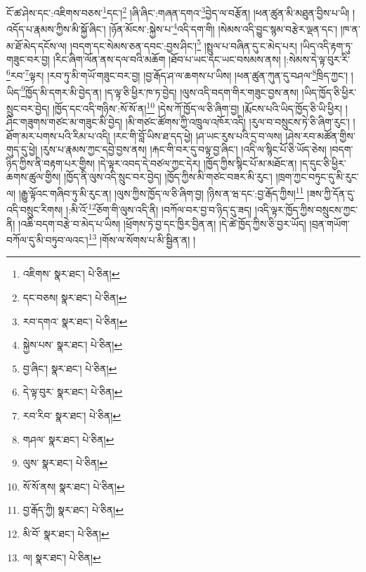 ངོ་ཚ་ཤེས་དང་:འཇིགས་བཅས་\footnote{འཇིགས་  སྣར་ཐང་།  པེ་ཅིན། }དང་།\footnote{དང་བཅས།  སྣར་ཐང་།  པེ་ཅིན། } །ཞི་ཞིང་:གཞན་དགའ་\footnote{རབ་དགའ་  སྣར་ཐང་།  པེ་ཅིན། }བྱེད་ལ་བརྩོན། །ཕན་ཚུན་མི་མཐུན་བྱིས་པ་ཡི། །འདོད་པ་རྣམས་ཀྱིས་མི་སྐྱོ་ཞིང་། །ཉོན་མོངས་:སྐྱེས་པ་\footnote{སྐྱེས་པས་  སྣར་ཐང་།  པེ་ཅིན། }འདི་དག་གི། །སེམས་འདི་བྱུང་སྙམ་བརྩེར་ལྡན་དང་། །ཁ་ན་མ་ཐོ་མེད་དངོས་ལ། །བདག་དང་སེམས་ཅན་དབང་:བྱས་ཤིང་།\footnote{བྱ་ཞིང་།  སྣར་ཐང་།  པེ་ཅིན། } །སྤྲུལ་པ་བཞིན་དུ་ང་མེད་པར། །ཡིད་འདི་རྟག་ཏུ་གཟུང་བར་བྱ། །རིང་ཞིག་ལོན་ནས་དལ་བའི་མཆོག །ཐོབ་པ་ཡང་དང་ཡང་བསམས་ནས། །:སེམས་དེ་ལྟ་བུར་རི་\footnote{དེ་ལྟ་བུར་  སྣར་ཐང་།  པེ་ཅིན། }རབ་\footnote{རབ་རིབ་  སྣར་ཐང་།  པེ་ཅིན། }ལྟར། །རབ་ཏུ་མི་གཡོ་གཟུང་བར་བྱ། །བྱ་རྒོད་ཤ་ལ་ཆགས་པ་ཡིས། །ཕན་ཚུན་ཀུན་དུ་བཤལ་\footnote{གཤལ་  སྣར་ཐང་།  པེ་ཅིན། }ཁྲིད་ཀྱང་། །ཡིད་\footnote{ལུས་  སྣར་ཐང་།  པེ་ཅིན། }ཁྱོད་མི་དགར་མི་བྱེད་ན། །ད་ལྟ་ཅི་ཕྱིར་ཁ་ཏ་བྱེད། །ལུས་འདི་བདག་གིར་གཟུང་བྱས་ནས། །ཡིད་ཁྱོད་ཅི་ཕྱིར་སྲུང་བར་བྱེད། །ཁྱོད་དང་འདི་གཉིས་:སོ་སོ་ན།\footnote{སོ་སོ་ནས།  སྣར་ཐང་།  པེ་ཅིན། } །དེས་ཀོ་ཁྱོད་ལ་ཅི་ཞིག་བྱ། །རྨོངས་པའི་ཡིད་ཁྱོད་ཅི་ཡི་ཕྱིར། །ཤིང་གཟུགས་གཙང་མ་གཟུང་མི་བྱེད། །མི་གཙང་ཚོགས་ཀྱི་འཁྲུལ་འཁོར་འདི། །རུལ་བ་བསྲུངས་ཏེ་ཅི་ཞིག་རུང་། །ཐོག་མར་པགས་པའི་རིམ་པ་འདི། །རང་གི་བློ་ཡིས་ཐ་དད་ཕྱེ། །ཤ་ཡང་རུས་པའི་དྲ་བ་ལས། །ཤེས་རབ་མཚོན་གྱིས་གུད་དུ་ཕྱེ། །རུས་པ་རྣམས་ཀྱང་དབྱེ་བྱས་ནས། །རྐང་གི་བར་དུ་བལྟ་བྱ་ཞིང་། །འདི་ལ་སྙིང་པོ་ཅི་ཡོད་ཅེས། །བདག་ཉིད་ཀྱིས་ནི་བརྟག་པར་གྱིས། །དེ་ལྟར་འབད་དེ་བཙལ་ཀྱང་དེར། །ཁྱོད་ཀྱིས་སྙིང་པོ་མ་མཐོང་ན། །ད་དུང་ཅི་ཕྱིར་ཆགས་ཚུལ་གྱིས། །ཁྱོད་ནི་ལུས་འདི་སྲུང་བར་བྱེད། །ཁྱོད་ཀྱིས་མི་གཙང་བཟར་མི་རུང་། །ཁྲག་ཀྱང་བཏུང་དུ་མི་རུང་ལ། །རྒྱུ་ལྟོའང་གཞིབ་ཏུ་མི་རུང་ན། །ལུས་ཀྱིས་ཁྱོད་ལ་ཅི་ཞིག་བྱ། །ཉིས་ན་ཝ་དང་:བྱ་རྒོད་ཀྱིས།\footnote{བྱ་རྒོད་ཀྱི།  སྣར་ཐང་།  པེ་ཅིན། } །ཟས་ཀྱི་དོན་དུ་འདི་བསྲུང་རིགས། །:མི་འོ་\footnote{མི་བོ་  སྣར་ཐང་།  པེ་ཅིན། }ཅོག་གི་ལུས་འདི་ནི། །བཀོལ་བར་བྱ་བ་ཉིད་དུ་ཟད། །འདི་ལྟར་ཁྱོད་ཀྱིས་བསྲུངས་ཀྱང་ནི། །འཆི་བདག་བརྩེ་བ་མེད་པ་ཡིས། །ཕྲོགས་ཏེ་བྱ་དང་ཁྱིར་བྱིན་ན། །དེ་ཚེ་ཁྱོད་ཀྱིས་ཅི་བྱར་ཡོད། །བྲན་གཡོག་བཀོལ་དུ་མི་བཏུབ་ལའང་།\footnote{ལ།  སྣར་ཐང་།  པེ་ཅིན། } །གོས་ལ་སོགས་པ་མི་སྦྱིན་ན། །
